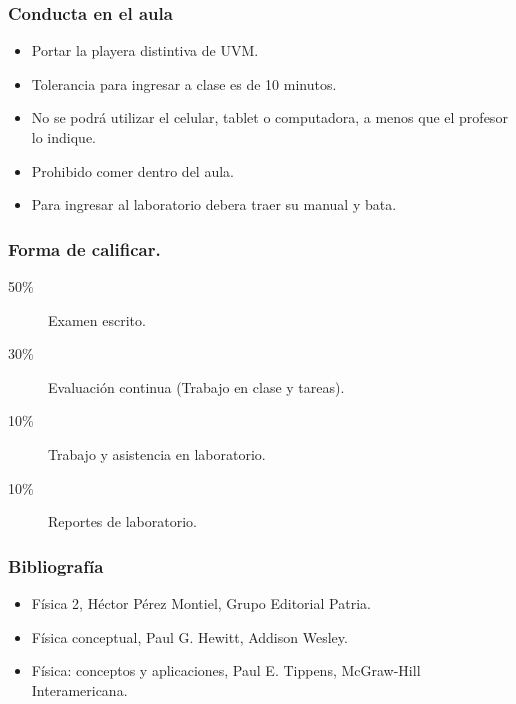 \documentclass[handout]{beamer}
\begin{document}
\begin{frame}
  \frametitle{Conducta en el aula}
  \begin{itemize}
  \item Portar la playera distintiva de UVM.
  \item Tolerancia para ingresar a clase es de 10 minutos.
  \item No se podrá utilizar el celular, tablet o computadora, a menos que el profesor lo indique.
  \item Prohibido comer dentro del aula.
  \item Para ingresar al laboratorio debera traer su manual y bata.
  \end{itemize}
\end{frame}


\begin{frame}
  \frametitle{Forma de calificar.}
  \begin{description}
  \item[50\%] Examen escrito.
  \item[30\%] Evaluación continua (Trabajo en clase y tareas).
  \item[10\%] Trabajo y asistencia en laboratorio.
  \item[10\%] Reportes de laboratorio.
  \end{description}
\end{frame}

\begin{frame}
  \frametitle{Bibliografía}
  \begin{itemize}
  \item Física 2, Héctor Pérez Montiel, Grupo Editorial Patria.
  \item Física conceptual, Paul G. Hewitt, Addison Wesley.
  \item Física: conceptos y aplicaciones, Paul E. Tippens, McGraw-Hill Interamericana.
  \end{itemize}
\end{frame}
\end{document}
